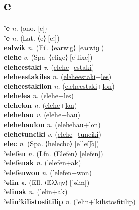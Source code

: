 

\section{e}

\textbf{'e} \textit{n.} (ono. [e])
 \label{'e} \\
\textbf{'e} \textit{n.} (Lat. ⟨e⟩ [eː])
 \label{'e} \\
\textbf{ealwik} \textit{n.} (Fil. ⟨earwig⟩ [eaɾwiɡ])
 \label{ealwik} \\
\textbf{elehe} \textit{v.} (Spa. ⟨elige⟩ [eˈlixe])
 \label{elehe} \\
\textbf{eleheestaki} \textit{v.} (\hyperref[elehe]{elehe}+\hyperref[estaki]{estaki})
 \label{eleheestaki} \\
\textbf{eleheestakiles} \textit{n.} (\hyperref[eleheestaki]{eleheestaki}+\hyperref[les]{les})
 \label{eleheestakiles} \\
\textbf{eleheestakilon} \textit{n.} (\hyperref[eleheestaki]{eleheestaki}+\hyperref[lon]{lon})
 \label{eleheestakilon} \\
\textbf{eleheles} \textit{n.} (\hyperref[elehe]{elehe}+\hyperref[les]{les})
 \label{eleheles} \\
\textbf{elehelon} \textit{n.} (\hyperref[elehe]{elehe}+\hyperref[lon]{lon})
 \label{elehelon} \\
\textbf{elehehau} \textit{v.} (\hyperref[elehe]{elehe}+\hyperref[hau]{hau})
 \label{elehehau} \\
\textbf{elehehaulon} \textit{n.} (\hyperref[elehehau]{elehehau}+\hyperref[lon]{lon})
 \label{elehehaulon} \\
\textbf{elehetunciki} \textit{v.} (\hyperref[elehe]{elehe}+\hyperref[tunciki]{tunciki})
 \label{elehetunciki} \\
\textbf{elec} \textit{n.} (Spa. ⟨helecho⟩ [eˈlet͡ʃo])
 \label{elec} \\
\textbf{'elefen} \textit{n.} (Lfn. ⟨Elefen⟩ [elefen])
 \label{'elefen} \\
\textbf{'elefenak} \textit{n.} (\hyperref['elefen]{'elefen}+\hyperref[ak]{ak})
 \label{'elefenak} \\
\textbf{'elefenwon} \textit{n.} (\hyperref['elefen]{'elefen}+\hyperref[won]{won})
 \label{'elefenwon} \\
\textbf{'elin} \textit{n.} (Ell. ⟨Έλλην⟩ [ˈelin])
 \label{'elin} \\
\textbf{'elinak} \textit{n.} (\hyperref['elin]{'elin}+\hyperref[ak]{ak})
 \label{'elinak} \\
\textbf{'elin'kilistosfitilip} \textit{n.} (\hyperref['elin]{'elin}+\hyperref['kilistosfitilip]{'kilistosfitilip})
